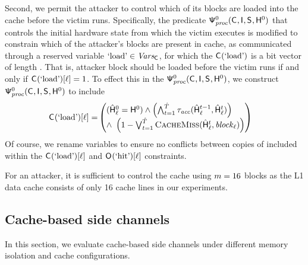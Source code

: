 Second, we permit the attacker to control which of its blocks are
loaded into the cache before the victim runs.  Specifically, the
predicate $\mathsf{\Psi}_{\mathit{proc}}^{0}(\mathsf{C}_{}, \mathsf{I}_{}, \mathsf{S}_{},
\mathsf{H}_{}^{0})$ that controls the initial hardware state from which the
victim executes is modified to constrain which of the attacker's
blocks are present in cache, as communicated through a reserved
variable $\textrm{`load'} \in \mathit{Vars_{\mathsf{C}_{}}}$, for which the
$\mathsf{C}_{}(\textrm{`load'})$ is a bit vector of length \blockNmbr.  That is,
attacker block \block{\blockIdx} should be loaded before the victim
runs if and only if $\mathsf{C}_{}(\textrm{`load'})[\ell] = 1$.  To effect
this in the $\mathsf{\Psi}_{\mathit{proc}}^{0}(\mathsf{C}_{},
\mathsf{I}_{}, \mathsf{S}_{}, \mathsf{H}_{}^{0})$, we construct
$\mathsf{\Psi}_{\mathit{proc}}^{0}(\mathsf{C}_{}, \mathsf{I}_{}, \mathsf{S}_{}, \mathsf{H}_{}^{0})$
to include
\begin{align*}
  \ACIFn{}(\loadVar)[\blockIdx] = &
  \left(\!\!\!\begin{array}{ll}
    (\HwFnAccess{\blockIdx}{0} = \HwFn{}{0}) \wedge \left(\bigwedge_{\cycle
  = 1}^{\ncyclesAccess}
\TmpTransConstraints{\accessProc}(\HwFnAccess{\blockIdx}{\cycle-1},
\HwFnAccess{\blockIdx}{\cycle})\right) \\
\wedge~\hfill\left(1 - \bigvee_{\cycle = 1}^{\ncyclesAccess}
\cachemiss(\HwFnAccess{\blockIdx}{\cycle}, \block{\blockIdx})\right)
\end{array}\!\!\!\right)
\end{align*}
Of course, we rename variables to ensure no conflicts between copies
of \HwFnAccess{\blockIdx}{\cycle} included within the
$\mathsf{C}_{}(\textrm{`load'})[\ell]$ and $\mathsf{O}_{}(\textrm{`hit'})[\ell]$
constraints.

For an attacker, it is sufficient to control the cache using
$m=16$ blocks as the L1 data cache consists of only 16
cache lines in our experiments.

\subsection{Cache-based side channels}
\label{dinome:sec:exp:cache}

In this section, we evaluate cache-based side channels under different
memory isolation and cache configurations.

